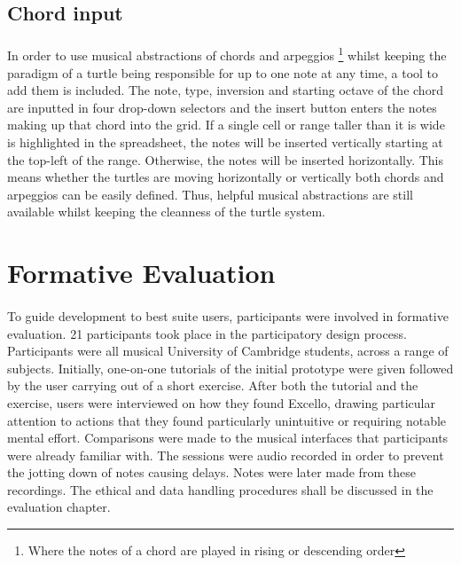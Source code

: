 \subsection{Chord input}

\paragraph{} In order to use musical abstractions of chords and arpeggios \footnote{Where the notes of a chord are played in rising or descending order} whilst keeping the paradigm of a turtle being responsible for up to one note at any time, a tool to add them is included. The note, type, inversion and starting octave of the chord are inputted in four drop-down selectors and the insert button enters the notes making up that chord into the grid. If a single cell or range taller than it is wide is highlighted in the spreadsheet, the notes will be inserted vertically starting at the top-left of the range. Otherwise, the notes will be inserted horizontally. This means whether the turtles are moving horizontally or vertically both chords and arpeggios can be easily defined. Thus, helpful musical abstractions are still available whilst keeping the cleanness of the turtle system.

\section{Formative Evaluation}

\paragraph{} To guide development to best suite users, participants were involved in formative evaluation. 21 participants took place in the participatory design process. Participants were all musical University of Cambridge students, across a range of subjects. Initially, one-on-one tutorials of the initial prototype were given followed by the user carrying out of a short exercise. After both the tutorial and the exercise, users were interviewed on how they found Excello, drawing particular attention to actions that they found particularly unintuitive or requiring notable mental effort. Comparisons were made to the musical interfaces that participants were already familiar with. The sessions were audio recorded in order to prevent the jotting down of notes causing delays. Notes were later made from these recordings. The ethical and data handling procedures shall be discussed in the evaluation chapter.

